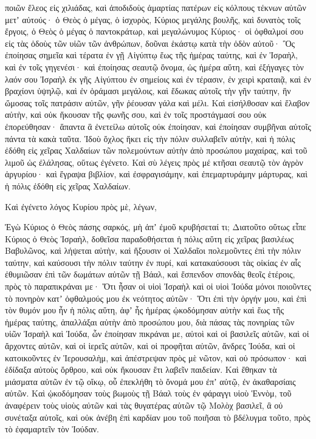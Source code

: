 {ποιῶν ἔλεος εἰς χιλιάδας, καὶ ἀποδιδοὺς ἁμαρτίας πατέρων εἰς κόλπους τέκνων αὐτῶν μετʼ αὐτούς· ὁ Θεὸς ὁ μέγας, ὁ ἰσχυρὸς,
Κύριος μεγάλης βουλῆς, καὶ δυνατὸς τοῖς ἔργοις, ὁ Θεὸς ὁ μέγας ὁ παντοκράτωρ, καὶ μεγαλώνυμος Κύριος· οἱ ὀφθαλμοί σου εἰς τὰς ὁδοὺς τῶν υἱῶν τῶν ἀνθρώπων, δοῦναι ἑκάστῳ κατὰ τὴν ὁδὸν αὐτοῦ·
Ὃς ἐποίησας σημεῖα καὶ τέρατα ἐν γῇ Αἰγύπτῳ ἕως τῆς ἡμέρας ταύτης, καὶ ἐν Ἰσραὴλ, καὶ ἐν τοῖς γηγενέσι· καὶ ἐποίησας σεαυτῷ ὄνομα, ὡς ἡμέρα αὕτη,
καὶ ἐξήγαγες τὸν λαόν σου Ἰσραὴλ ἐκ γῆς Αἰγύπτου ἐν σημείοις καὶ ἐν τέρασιν, ἐν χειρὶ κραταιᾷ,
καὶ ἐν βραχίονι ὑψηλῷ, καὶ ἐν ὁράμασι μεγάλοις, καὶ ἔδωκας αὐτοῖς τὴν γῆν ταύτην, ἣν ὤμοσας τοῖς πατράσιν αὐτῶν, γῆν ῥέουσαν γάλα καὶ μέλι.
Καὶ εἰσήλθοσαν καὶ ἔλαβον αὐτὴν, καὶ οὐκ ἤκουσαν τῆς φωνῆς σου, καὶ ἐν τοῖς προστάγμασί σου οὐκ ἐπορεύθησαν· ἅπαντα ἃ ἐνετείλω αὐτοῖς οὐκ ἐποίησαν, καὶ ἐποίησαν συμβῆναι αὐτοῖς πάντα τὰ κακὰ ταῦτα.
Ἰδοὺ ὄχλος ἥκει εἰς τὴν πόλιν συλλαβεῖν αὐτὴν, καὶ ἡ πόλις ἐδόθη εἰς χεῖρας Χαλδαίων τῶν πολεμούντων αὐτὴν ἀπὸ προσώπου μαχαίρας, καὶ τοῦ λιμοῦ ὡς ἐλάλησας, οὕτως ἐγένετο.
Καὶ σὺ λέγεις πρὸς μέ κτῆσαι σεαυτῷ τὸν ἀγρὸν ἀργυρίου· καὶ ἔγραψα βιβλίον, καὶ ἐσφραγισάμην, καὶ ἐπεμαρτυράμην μάρτυρας, καὶ ἡ πόλις ἐδόθη εἰς χεῖρας Χαλδαίων.
\par }{\PP {}Καὶ ἐγένετο λόγος Κυρίου πρὸς μὲ, λέγων,
\par }{\PP {}Ἐγὼ Κύριος ὁ Θεὸς πάσης σαρκός, μὴ ἀπʼ ἐμοῦ κρυβήσεταί τι;
Διατοῦτο οὕτως εἶπε Κύριος ὁ Θεὸς Ἰσραὴλ, δοθεῖσα παραδοθήσεται ἡ πόλις αὕτη εἰς χεῖρας βασιλέως Βαβυλῶνος, καὶ λήψεται αὐτὴν,
καὶ ἥξουσιν οἱ Χαλδαῖοι πολεμοῦντες ἐπὶ τὴν πόλιν ταύτην, καὶ καύσουσι τὴν πόλιν ταύτην ἐν πυρί, καὶ κατακαύσουσι τὰς οἰκίας ἐν αἷς ἐθυμιῶσαν ἐπὶ τῶν δωμάτων αὐτῶν τῇ Βάαλ, καὶ ἔσπενδον σπονδὰς θεοῖς ἑτέροις, πρὸς τὸ παραπικράναι με·
Ὅτι ἦσαν οἱ υἱοὶ Ἰσραὴλ καὶ οἱ υἱοὶ Ἰούδα μόνοι ποιοῦντες τὸ πονηρὸν κατʼ ὀφθαλμούς μου ἐκ νεότητος αὐτῶν·
Ὅτι ἐπὶ τὴν ὀργήν μου, καὶ ἐπὶ τὸν θυμόν μου ἦν ἡ πόλις αὕτη, ἀφʼ ἧς ἡμέρας ᾠκοδόμησαν αὐτὴν καὶ ἕως τῆς ἡμέρας ταύτης, ἀπαλλάξαι αὐτὴν ἀπὸ προσώπου μου,
διὰ πάσας τὰς πονηρίας τῶν υἱῶν Ἰσραὴλ καὶ Ἰούδα, ὧν ἐποίησαν πικράναι με, αὐτοὶ καὶ οἱ βασιλεῖς αὐτῶν, καὶ οἱ ἄρχοντες αὐτῶν, καὶ οἱ ἱερεῖς αὐτῶν, καὶ οἱ προφῆται αὐτῶν, ἄνδρες Ἰούδα, καὶ οἱ κατοικοῦντες ἐν Ἱερουσαλὴμ,
καὶ ἀπέστρεψαν πρὸς μὲ νῶτον, καὶ οὐ πρόσωπον· καὶ ἐδίδαξα αὐτοὺς ὄρθρου, καὶ οὐκ ἤκουσαν ἔτι λαβεῖν παιδείαν.
Καὶ ἔθηκαν τὰ μιάσματα αὐτῶν ἐν τῷ οἴκῳ, οὗ ἐπεκλήθη τὸ ὄνομά μου ἐπʼ αὐτῷ, ἐν ἀκαθαρσίαις αὐτῶν.
Καὶ ᾠκοδόμησαν τοὺς βωμοὺς τῇ Βάαλ τοὺς ἐν φάραγγι υἱοὺ Ἑννὸμ, τοῦ ἀναφέρειν τοὺς υἱοὺς αὐτῶν καὶ τὰς θυγατέρας αὐτῶν τῷ Μολὸχ βασιλεῖ, ἃ οὐ συνέταξα αὐτοῖς, καὶ οὐκ ἀνέβη ἐπὶ καρδίαν μου τοῦ ποιῆσαι τὸ βδέλυγμα τοῦτο, πρὸς τὸ ἐφαμαρτεῖν τὸν Ἰούδαν.
}
